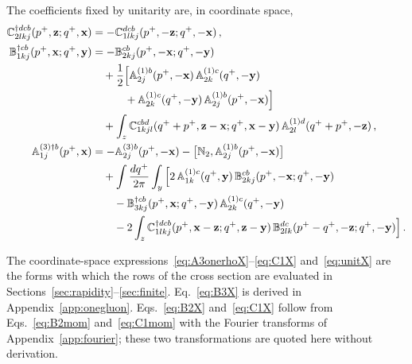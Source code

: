 The coefficients fixed by unitarity are, in coordinate space,
\begin{align}\label{eq:unitX}
\mathbb{C}^{\dagger dcb}_{2lkj}(p^+,\mathbf{z};q^+,\mathbf{x})&=-\mathbb{C}^{dcb}_{1lkj}(p^+,-\mathbf{z};q^+,-\mathbf{x})\,,\notag\\
\mathbb{B}^{\dagger cb}_{1kj}(p^+,\mathbf{x};q^+,\mathbf{y})&=-\mathbb{B}^{cb}_{2kj}(p^+,-\mathbf{x};q^+,-\mathbf{y})\notag\\
&\quad+\frac12\Big[\mathbb{A}^{(1)b}_{2j}(p^+,-\mathbf{x})\,\mathbb{A}^{(1)c}_{2k}(q^+,-\mathbf{y})\notag\\&\qquad\quad+\mathbb{A}^{(1)c}_{2k}(q^+,-\mathbf{y})\,\mathbb{A}^{(1)b}_{2j}(p^+,-\mathbf{x})\Big]
\notag\\&\quad
+\int_z\mathbb{C}^{cbd}_{1kjl}(q^++p^+,\mathbf{z}-\mathbf{x};q^+,\mathbf{x}-\mathbf{y})\,\mathbb{A}^{(1)d}_{2l}(q^++p^+,-\mathbf{z})\,,\notag\\
\mathbb{A}^{(3)\dagger b}_{1j}(p^+,\mathbf{x})&=-\mathbb{A}^{(3)b}_{2j}(p^+,-\mathbf{x})-\big[\mathbb{N}_2,\mathbb{A}^{(1)b}_{2j}(p^+,-\mathbf{x})\big]
\notag\\&\quad+\int\frac{dq^+}{2\pi}\int_y\Big[2\,\mathbb{A}^{(1)c}_{1k}(q^+,\mathbf{y})\,\mathbb{B}^{cb}_{2kj}(p^+,-\mathbf{x};q^+,-\mathbf{y})
\notag\\&\qquad
-\mathbb{B}^{\dagger cb}_{3kj}(p^+,\mathbf{x};q^+,-\mathbf{y})\,\mathbb{A}^{(1)c}_{2k}(q^+,-\mathbf{y})
\notag\\&\qquad-2\int_z\mathbb{C}^{\dagger dcb}_{1lkj}(p^+,\mathbf{x}-\mathbf{z};q^+,\mathbf{z}-\mathbf{y})\,\mathbb{B}^{dc}_{2lk}(p^+-q^+,-\mathbf{z};q^+,-\mathbf{y})\Big]\,.
\end{align}

The coordinate-space expressions~\eqref{eq:A3onerhoX}--\eqref{eq:C1X} and~\eqref{eq:unitX} are the forms with which the rows of the cross section are evaluated in Sections~\ref{sec:rapidity}--\ref{sec:finite}. Eq.~\eqref{eq:B3X} is derived in Appendix~\ref{app:onegluon}. Eqs.~\eqref{eq:B2X} and~\eqref{eq:C1X} follow from Eqs.~\eqref{eq:B2mom} and~\eqref{eq:C1mom} with the Fourier transforms of Appendix~\ref{app:fourier}; these two transformations are quoted here without derivation.
